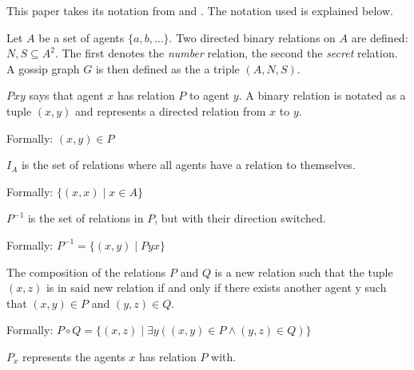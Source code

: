 This paper takes its notation from \Textcite{van_ditmarsch_dynamic_2018} and \Textcite{van_ditmarsch_strengthening_2019}.
The notation used is explained below.

\begin{definition}
    Let \(A\) be a set of agents \(\{a, b, \dots\}\).
    Two directed binary relations on \(A\) are defined: \(N, S \subseteq A^2\).
    The first denotes the \textit{number} relation, the second the \textit{secret} relation.
    A gossip graph \(G\) is then defined as the a triple \((A, N, S)\).
\end{definition}

\begin{definition}
    
\begin{subdefinition}
    \(Pxy\) says that agent \(x\) has relation \(P\) to agent \(y\). 
    A binary relation is notated as a tuple \((x,y)\) and represents a directed relation from \(x\) to \(y\). 
    
    Formally: \((x, y) \in P\)
    \label{def:rel-bin}
\end{subdefinition}

\begin{subdefinition}
    \(I_A\) is the set of relations where all agents have a relation to themselves.
    
    Formally: \(\{(x,x) \mid x \in A\}\)
    \label{def:rel-id}
\end{subdefinition}

\begin{subdefinition}
    \(P^{-1}\) is the set of relations in \(P\), but with their direction switched.

    Formally: \(P^{-1} = \{(x,y) \mid Pyx\}\)
    \label{def:rel-conv}
\end{subdefinition}

\begin{subdefinition}
    The composition of the relations \(P\) and \(Q\) is a new relation such that the tuple \((x,z)\) is in said new relation if and only if there exists another agent y such that \((x,y) \in P\) and \((y,z) \in Q\).

    Formally: \(P \circ Q = \{(x,z) \mid \exists y ((x, y) \in P \land (y, z) \in Q) \}\)
    \label{def:rel-comp}
\end{subdefinition}

\begin{subdefinition}
    \(P_x\) represents the agents \(x\) has relation \(P\) with.


\end{subdefinition}
\end{definition}
